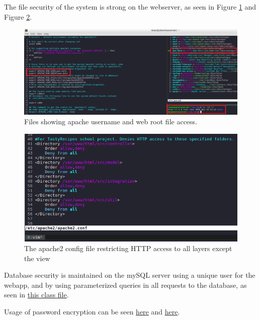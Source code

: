 \documentclass[a4paper]{scrreprt}
\begin{document}
The file security of the system is strong on the webserver, as seen in Figure \ref{fig:ownership} and Figure \ref{fig:reqaccess}.

\begin{figure}[h!]
  \begin{center}
    \includegraphics[scale=0.41]{img/filesecurity_ownership.png}
    \caption{Files showing apache username and web root file access.}
    \label{fig:ownership}
  \end{center}
\end{figure}

\begin{figure}[h!]
  \begin{center}
    \includegraphics[scale=0.41]{img/filesecurity_reqaccess.png}
    \caption{The apache2 config file restricting HTTP access to all layers except the view}
    \label{fig:reqaccess}
  \end{center}
\end{figure}

Database security is maintained on the mySQL server using a unique user for the webapp, and by using parameterized queries in all requests to the database, as seen in \href{https://github.com/fongie/TastyRecipes/blob/assignment3/src/integration/DatabaseRequest.php}{this class file}.

Usage of password encryption can be seen \href{https://github.com/fongie/TastyRecipes/blob/86f4548c3b4659b762134c756cc5ac4c0cbf72a2/src/model/UserAccountHandler.php#L35}{here} and \href{https://github.com/fongie/TastyRecipes/blob/86f4548c3b4659b762134c756cc5ac4c0cbf72a2/src/model/UserAccountHandler.php#L18}{here}.
\end{document}
